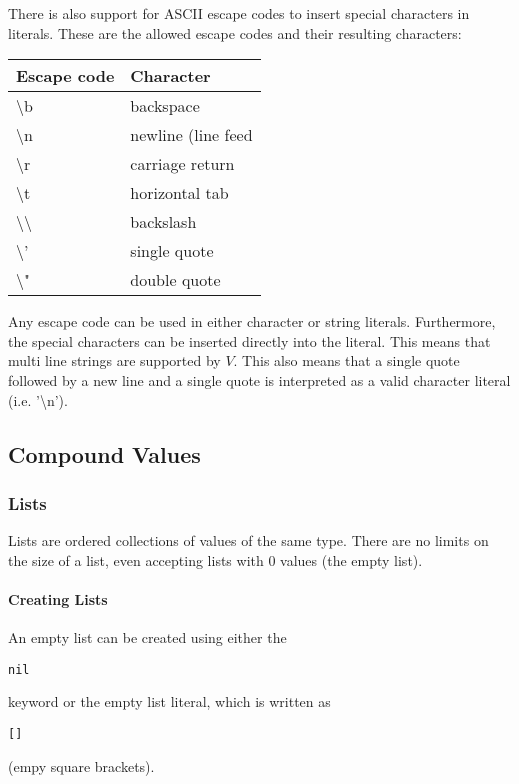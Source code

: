 \documentclass{article}
\def\code#1{\begin{footnotesize}\texttt{#1}\end{footnotesize}}
\begin{document}
There is also support for ASCII escape codes to insert special characters in literals.
These are the allowed escape codes and their resulting characters:

\medskip

\begin{tabular}{|l|l|}
  \hline
  \textbf{Escape code} & \textbf{Character}\\
  \hline
  \textbackslash b & backspace\\
  \hline
  \textbackslash n & newline (line feed\\
  \hline
  \textbackslash r & carriage return\\
  \hline
  \textbackslash t & horizontal tab\\
  \hline
  \textbackslash \textbackslash & backslash\\
  \hline
  \textbackslash '  & single quote\\
  \hline
  \textbackslash "  & double quote\\
  \hline
\end{tabular}

\bigskip

Any escape code can be used in either character or string literals.
Furthermore, the special characters can be inserted directly into the literal.
This means that multi line strings are supported by $V$.
This also means that a single quote followed by a new line and a single quote is interpreted as a valid character literal (i.e. '\textbackslash n').

\subsection{Compound Values}

\subsubsection{Lists}

Lists are ordered collections of values of the same type.
There are no limits on the size of a list, even accepting lists with 0 values (the empty list).

\paragraph{Creating Lists}

An empty list can be created using either the \code{nil} keyword or the empty list literal, which is written as \code{[]} (empy square brackets).
\end{document}
